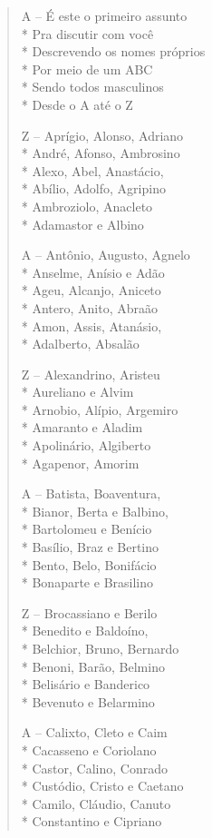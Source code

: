 \begin{verse}
A -- É este o primeiro assunto\\*
Pra discutir com você\\*
Descrevendo os nomes próprios\\*
Por meio de um ABC\\*
Sendo todos masculinos\\*
Desde o A até o Z

Z -- Aprígio, Alonso, Adriano\\*
André, Afonso, Ambrosino\\*
Alexo, Abel, Anastácio,\\*
Abílio, Adolfo, Agripino\\*
Ambroziolo, Anacleto\\*
Adamastor e Albino

A -- Antônio, Augusto, Agnelo\\*
Anselme, Anísio e Adão\\*
Ageu, Alcanjo, Aniceto\\*
Antero, Anito, Abraão\\*
Amon, Assis, Atanásio,\\*
Adalberto, Absalão

Z -- Alexandrino, Aristeu\\*
Aureliano e Alvim\\*
Arnobio, Alípio, Argemiro\\*
Amaranto e Aladim\\*
Apolinário, Algiberto\\*
Agapenor, Amorim

A -- Batista, Boaventura,\\*
Bianor, Berta e Balbino,\\*
Bartolomeu e Benício\\*
Basílio, Braz e Bertino\\*
Bento, Belo, Bonifácio\\*
Bonaparte e Brasilino

Z -- Brocassiano e Berilo\\*
Benedito e Baldoíno,\\*
Belchior, Bruno, Bernardo\\*
Benoni, Barão, Belmino\\*
Belisário e Banderico\\*
Bevenuto e Belarmino

A -- Calixto, Cleto e Caim\\*
Cacasseno e Coriolano\\*
Castor, Calino, Conrado\\*
Custódio, Cristo e Caetano\\*
Camilo, Cláudio, Canuto\\*
Constantino e Cipriano


\end{verse}
